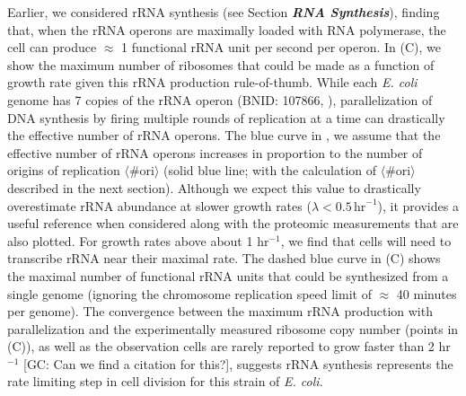 
Earlier, we considered rRNA synthesis (see Section \textit{\bf RNA
Synthesis}), finding that, when the rRNA operons are maximally loaded with
RNA polymerase, the cell can produce $\approx$ 1 functional rRNA unit per
second per operon. In (C), we show the maximum number of
ribosomes that could be made as a function of growth rate given this rRNA
production rule-of-thumb. While each \textit{E. coli} genome has 7 copies of
the rRNA operon (BNID: 107866, \cite{milo2010}), parallelization of DNA
synthesis by firing multiple rounds of replication at a time can drastically
the effective number of rRNA operons. The blue curve in
, we assume that the effective number of rRNA operons
increases in proportion to the number of origins of replication
$\langle\text{\# ori}\rangle$ (solid blue line; with the calculation of
$\langle\text{\# ori}\rangle$ described in the next section). Although we
expect this value to drastically overestimate rRNA abundance at slower growth
rates ($\lambda < 0.5\, \text{hr}^{-1}$), it provides a useful reference when
considered along with the proteomic measurements that are also plotted. For
growth rates above about 1 hr$^{-1}$, we find that cells will need to
transcribe rRNA near their maximal rate.  The dashed blue curve in
(C) shows the maximal number of functional rRNA units that
could be synthesized from a single genome (ignoring the chromosome replication
speed limit of $\approx$ 40 minutes per genome). The convergence between the maximum
rRNA production with parallelization and the experimentally measured ribosome
copy number (points in (C)), as well as the observation
cells are rarely reported to grow faster than 2 hr$^{-1}$ {\color{red}[GC: Can
we find a citation for this?]}, suggests rRNA
synthesis represents the rate limiting step in cell division for this strain
of \textit{E. coli}.